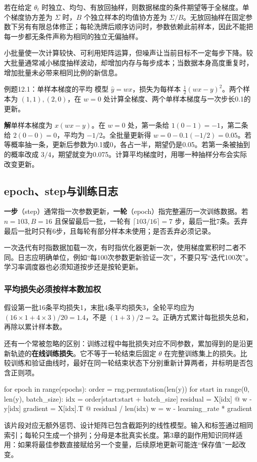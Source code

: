 \documentclass[UTF8,fontset=none,zihao=-4,a4paper]{ctexart}
\newcommand{\term}[1]{\textbf{#1}}
\newcommand{\sol}{\par\noindent\textbf{解}\quad}
\newcommand{\code}[1]{\texttt{\detokenize{#1}}}
\numberwithin{equation}{section}
\numberwithin{figure}{section}
\begin{document}
若在给定 $\theta_t$ 时独立、均匀、有放回抽样，则数据梯度的条件期望等于全梯度。单个梯度协方差为 $\Sigma$ 时，$B$ 个独立样本的均值协方差为 $\Sigma/B$。无放回抽样在固定参数下另有有限总体修正；每轮洗牌后顺序访问时，参数依赖此前样本，因此不能把每一步都无条件声称为相同的独立无偏抽样。

小批量使一次计算较快、可利用矩阵运算，但噪声让当前目标不一定每步下降。较大批量通常减小梯度抽样波动，却增加内存与每步成本；当数据本身高度重复时，增加批量未必带来相同比例的新信息。

\begin{infobox}{例题12.1：单样本梯度的平均}
模型 $\widehat y=wx$，损失为每样本 $\tfrac12(wx-y)^2$。两个样本为 $(1,1),(2,0)$，在 $w=0$ 处计算全梯度、两个单样本梯度与一次步长0.1的更新。
\end{infobox}
\sol 单样本梯度为 $x(wx-y)$。在 $w=0$ 处，第一条给 $1(0-1)=-1$，第二条给 $2(0-0)=0$，平均为 $-1/2$。全批量更新得 $w=0-0.1(-1/2)=0.05$。若等概率抽一条，更新后参数为0.1或0，各占一半，期望仍是0.05。若第一条被抽到的概率改成 $3/4$，期望就变为0.075。计算平均梯度时，用哪一种抽样分布会实际改变更新。

\subsection{epoch、step与训练日志}
\term{一步}（step）通常指一次参数更新，\term{一轮}（epoch）指完整遍历一次训练数据。若 $n=103,B=16$ 且保留最后一批，一轮有 $\lceil103/16\rceil=7$ 步，最后一批7条。丢弃最后一批时只有6步，且每轮有部分样本未使用；是否丢弃必须记录。

一次迭代有时指数据加载一次，有时指优化器更新一次，使用梯度累积时二者不同。日志应明确单位，例如“每100次参数更新验证一次”，不要只写“迭代100次”。学习率调度器也必须知道按步还是按轮更新。

\subsubsection{平均损失必须按样本数加权}
假设第一批16条平均损失1，末批4条平均损失3，全轮平均应为 $(16\times1+4\times3)/20=1.4$，不是 $(1+3)/2=2$。正确方式累计每批损失总和，再除以累计样本数。

还有一个常被忽略的区别：训练过程中每批损失对应不同参数，累加得到的是沿更新轨迹的\term{在线训练损失}。它不等于一轮结束后固定 $\theta$ 在完整训练集上的损失。比较训练和验证曲线时，最好在同一轮结束状态下分别重新计算两者，并标明是否包含正则项。

\begin{pycode}
for epoch in range(epochs):
    order = rng.permutation(len(y))
    for start in range(0, len(y), batch_size):
        idx = order[start:start + batch_size]
        residual = X[idx] @ w - y[idx]
        gradient = X[idx].T @ residual / len(idx)
        w = w - learning_rate * gradient
\end{pycode}
该片段对应无额外惩罚、设计矩阵已包含截距列的线性模型。输入和标签通过相同 \code{idx} 索引；每轮只生成一个排列；分母是本批真实长度。第3章的副作用知识同样适用：如果将最佳参数直接赋给另一个变量，后续原地更新可能连“保存值”一起改变。
\end{document}
